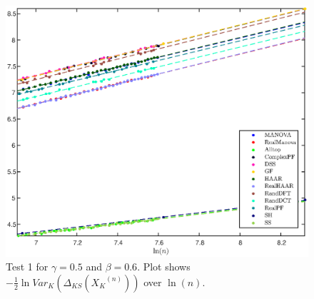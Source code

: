 \documentclass[a4paper,12pt]{article}
\newcommand{\Xk}{\ensuremath{X_K}}
\begin{document}
\begin{table}[h]
\centering


\caption{Results of Test 1 for $\gamma=0.5$ and $\beta=0.8$.}
\label{tab:KS1}
\end{table}

\begin{figure}[h]
\centering
\includegraphics[width=5in]{SpectrumKStestAll_empiricalVar_gamma0_5_beta1_67_minN1000_pnas4.eps}
\caption{Test 1 for $\gamma=0.5$ and $\beta=0.6$. Plot shows $-\frac{1}{2}\ln Var_{K}(\Delta_{KS}(\Xk^{(n)}))$ over $\ln(n)$. }
\label{fig:KS2}
\end{figure}
\end{document}
